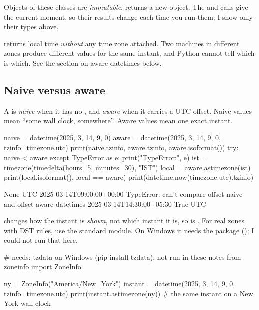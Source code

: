 Objects of these classes are \emph{immutable}.  returns a new object. The
 and  calls give the current moment, so their results change each time
you run them; I show only their types above.

\begin{trap}
 returns local time \emph{without} any time zone attached. Two machines in
different zones produce different values for the same instant, and Python cannot tell which is
which. See the section on aware datetimes below.
\end{trap}

\subsection{Naive versus aware}

A  is \emph{naive} when it has no , and \emph{aware} when it carries
a UTC offset. Naive values mean ``some wall clock, somewhere''. Aware values mean one exact
instant.

\begin{pycode}
naive = datetime(2025, 3, 14, 9, 0)
aware = datetime(2025, 3, 14, 9, 0, tzinfo=timezone.utc)
print(naive.tzinfo, aware.tzinfo, aware.isoformat())
try:
    naive < aware
except TypeError as e:
    print("TypeError:", e)
ist = timezone(timedelta(hours=5, minutes=30), "IST")
local = aware.astimezone(ist)
print(local.isoformat(), local == aware)
print(datetime.now(timezone.utc).tzinfo)
\end{pycode}
\begin{rawcode}
None UTC 2025-03-14T09:00:00+00:00
TypeError: can't compare offset-naive and offset-aware datetimes
2025-03-14T14:30:00+05:30 True
UTC
\end{rawcode}

 changes how the instant is \emph{shown}, not which instant it is, so
 is . For real zones with DST rules, use the standard
 module. On Windows it needs the  package (); I
could not run that here.

\begin{pycode}
# needs: tzdata on Windows (pip install tzdata); not run in these notes
from zoneinfo import ZoneInfo

ny = ZoneInfo("America/New_York")
instant = datetime(2025, 3, 14, 9, 0, tzinfo=timezone.utc)
print(instant.astimezone(ny))      # the same instant on a New York wall clock
\end{pycode}

